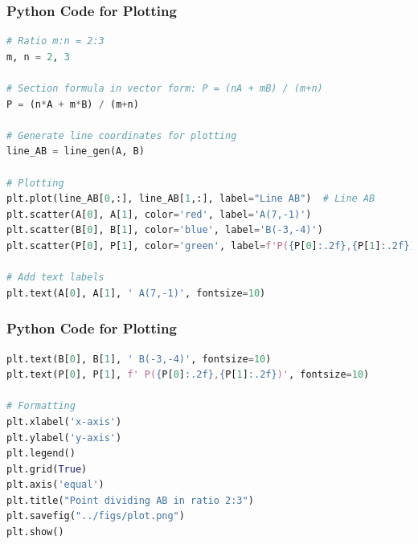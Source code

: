 \documentclass{beamer}
\theoremstyle{remark}
\numberwithin{equation}{section}
\begin{document}
\begin{frame}[fragile]
\frametitle{Python Code for Plotting}
\begin{lstlisting}[language=Python]
# Ratio m:n = 2:3
m, n = 2, 3

# Section formula in vector form: P = (nA + mB) / (m+n)
P = (n*A + m*B) / (m+n)

# Generate line coordinates for plotting
line_AB = line_gen(A, B)

# Plotting
plt.plot(line_AB[0,:], line_AB[1,:], label="Line AB")  # Line AB
plt.scatter(A[0], A[1], color='red', label='A(7,-1)')
plt.scatter(B[0], B[1], color='blue', label='B(-3,-4)')
plt.scatter(P[0], P[1], color='green', label=f'P({P[0]:.2f},{P[1]:.2f})')

# Add text labels
plt.text(A[0], A[1], ' A(7,-1)', fontsize=10)

\end{lstlisting}
\end{frame}

\begin{frame}[fragile]
\frametitle{Python Code for Plotting}
\begin{lstlisting}[language=Python]
plt.text(B[0], B[1], ' B(-3,-4)', fontsize=10)
plt.text(P[0], P[1], f' P({P[0]:.2f},{P[1]:.2f})', fontsize=10)

# Formatting
plt.xlabel('x-axis')
plt.ylabel('y-axis')
plt.legend()
plt.grid(True)
plt.axis('equal')
plt.title("Point dividing AB in ratio 2:3")
plt.savefig("../figs/plot.png")
plt.show()

\end{lstlisting}
\end{frame}
\end{document}
